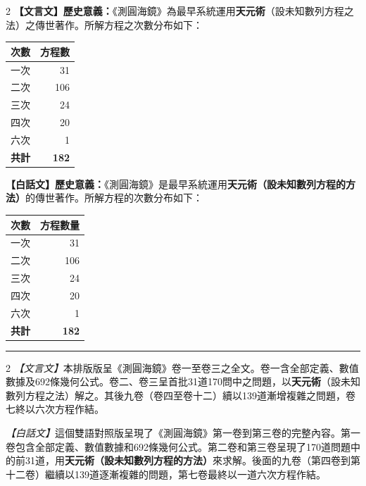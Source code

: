 \documentclass[11pt,a4paper]{article}
\begin{document}
\begin{paracol}{2}
\textbf{【文言文】}\textbf{歷史意義：}《測圓海鏡》為最早系統運用\textbf{天元術}（設未知數列方程之法）之傳世著作。所解方程之次數分布如下：

\begin{center}
\begin{tabular}{lr}
\toprule
\textbf{次數} & \textbf{方程數} \\
\midrule
一次 & 31 \\
二次 & 106 \\
三次 & 24 \\
四次 & 20 \\
六次 & 1 \\
\midrule
\textbf{共計} & \textbf{182} \\
\bottomrule
\end{tabular}
\end{center}

\switchcolumn
\textbf{【白話文】}\textbf{歷史意義：}《測圓海鏡》是最早系統運用\textbf{天元術（設未知數列方程的方法）}的傳世著作。所解方程的次數分布如下：

\begin{center}
\begin{tabular}{lr}
\toprule
\textbf{次數} & \textbf{方程數量} \\
\midrule
一次 & 31 \\
二次 & 106 \\
三次 & 24 \\
四次 & 20 \\
六次 & 1 \\
\midrule
\textbf{共計} & \textbf{182} \\
\bottomrule
\end{tabular}
\end{center}
\end{paracol}

\vspace{0.5cm}
\noindent\textcolor{rulecolor}{\rule{\textwidth}{0.4pt}}
\vspace{0.5cm}

\begin{paracol}{2}
\textit{【文言文】}本排版版呈《測圓海鏡》卷一至卷三之全文。卷一含全部定義、數值數據及692條幾何公式。卷二、卷三呈首批31道170問中之問題，以\textbf{天元術}（設未知數列方程之法）解之。其後九卷（卷四至卷十二）續以139道漸增複雜之問題，卷七終以六次方程作結。

\switchcolumn
\textit{【白話文】}這個雙語對照版呈現了《測圓海鏡》第一卷到第三卷的完整內容。第一卷包含全部定義、數值數據和692條幾何公式。第二卷和第三卷呈現了170道問題中的前31道，用\textbf{天元術（設未知數列方程的方法）}來求解。後面的九卷（第四卷到第十二卷）繼續以139道逐漸複雜的問題，第七卷最終以一道六次方程作結。
\end{paracol}
\end{document}
